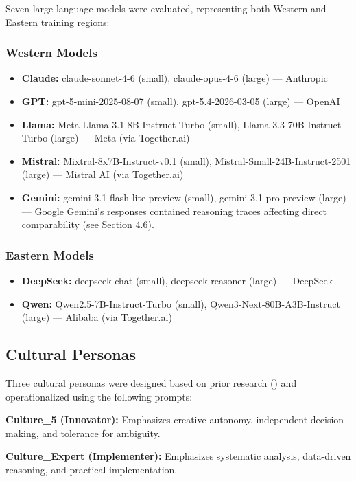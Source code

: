 \documentclass{article}
\begin{document}
Seven large language models were evaluated, representing both Western and Eastern training regions:

\subsubsection{Western Models}
\begin{itemize}
    \item \textbf{Claude:} claude-sonnet-4-6 (small), claude-opus-4-6 (large) — Anthropic
    \item \textbf{GPT:} gpt-5-mini-2025-08-07 (small), gpt-5.4-2026-03-05 (large) — OpenAI
    \item \textbf{Llama:} Meta-Llama-3.1-8B-Instruct-Turbo (small), Llama-3.3-70B-Instruct-Turbo (large) — Meta (via Together.ai)
    \item \textbf{Mistral:} Mixtral-8x7B-Instruct-v0.1 (small), Mistral-Small-24B-Instruct-2501 (large) — Mistral AI (via Together.ai)
    \item \textbf{Gemini:} gemini-3.1-flash-lite-preview (small), gemini-3.1-pro-preview (large) — Google \footnotesize Gemini's responses contained reasoning traces affecting direct comparability (see Section 4.6).
\end{itemize}

\subsubsection{Eastern Models}
\begin{itemize}
    \item \textbf{DeepSeek:} deepseek-chat (small), deepseek-reasoner (large) — DeepSeek
    \item \textbf{Qwen:} Qwen2.5-7B-Instruct-Turbo (small), Qwen3-Next-80B-A3B-Instruct (large) — Alibaba (via Together.ai)
\end{itemize}

\subsection{Cultural Personas}

Three cultural personas were designed based on prior research (\cite{haririLLMCreativityMeasuringExplaining2025}) and operationalized using the following prompts:

\textbf{Culture\_5 (Innovator):} Emphasizes creative autonomy, independent decision-making, and tolerance for ambiguity.

\textbf{Culture\_Expert (Implementer):} Emphasizes systematic analysis, data-driven reasoning, and practical implementation.
\end{document}
